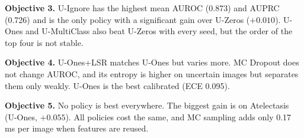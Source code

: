 \documentclass[conference]{IEEEtran}
\begin{document}
\textbf{Objective 3.} U-Ignore has the highest mean AUROC (0.873) and AUPRC (0.726) and is the only policy with a significant gain over U-Zeros ($+0.010$). U-Ones and U-MultiClass also beat U-Zeros with every seed, but the order of the top four is not stable.

\textbf{Objective 4.} U-Ones+LSR matches U-Ones but varies more. MC Dropout does not change AUROC, and its entropy is higher on uncertain images but separates them only weakly. U-Ones is the best calibrated (ECE 0.095).

\textbf{Objective 5.} No policy is best everywhere. The biggest gain is on Atelectasis (U-Ones, $+0.055$). All policies cost the same, and MC sampling adds only 0.17 ms per image when features are reused.

\clearpage


\end{document}
